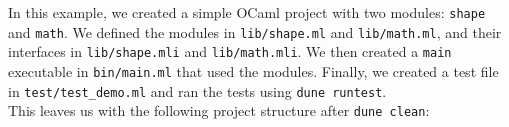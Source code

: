   \begin{Example}

    In this example, we created a simple OCaml project with two modules: \texttt{shape} and \texttt{math}. We defined the modules in \texttt{lib/shape.ml} and \texttt{lib/math.ml}, and their interfaces in \texttt{lib/shape.mli} and \texttt{lib/math.mli}. We then created a \texttt{main} executable in \texttt{bin/main.ml} that used the modules. Finally, we created a test file in \texttt{test/test\_demo.ml} and ran the tests using \texttt{dune runtest}.\\

    \noindent
    This leaves us with the following project structure after \texttt{dune clean}:\\
  \end{Example}


